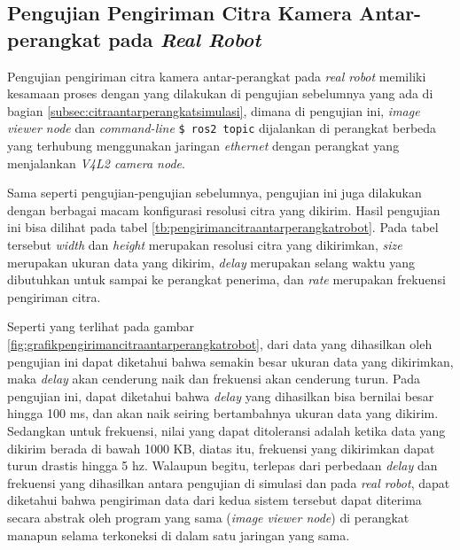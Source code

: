 \subsection{Pengujian Pengiriman Citra Kamera Antar-perangkat pada \emph{Real Robot}}
\label{subsec:citraantarperangkatrobot}



Pengujian pengiriman citra kamera antar-perangkat pada \emph{real robot} memiliki kesamaan proses dengan yang dilakukan di pengujian sebelumnya yang ada di bagian \ref{subsec:citraantarperangkatsimulasi},
  dimana di pengujian ini, \emph{image viewer node} dan \emph{command-line} \lstinline{$ ros2 topic} dijalankan di perangkat berbeda yang terhubung menggunakan jaringan \emph{ethernet} dengan perangkat yang menjalankan \emph{V4L2 camera node}.

Sama seperti pengujian-pengujian sebelumnya,
  pengujian ini juga dilakukan dengan berbagai macam konfigurasi resolusi citra yang dikirim.
Hasil pengujian ini bisa dilihat pada tabel \ref{tb:pengirimancitraantarperangkatrobot}.
Pada tabel tersebut \emph{width} dan \emph{height} merupakan resolusi citra yang dikirimkan,
  \emph{size} merupakan ukuran data yang dikirim,
  \emph{delay} merupakan selang waktu yang dibutuhkan untuk sampai ke perangkat penerima,
  dan \emph{rate} merupakan frekuensi pengiriman citra.



Seperti yang terlihat pada gambar \ref{fig:grafikpengirimancitraantarperangkatrobot},
  dari data yang dihasilkan oleh pengujian ini dapat diketahui bahwa semakin besar ukuran data yang dikirimkan,
  maka \emph{delay} akan cenderung naik dan frekuensi akan cenderung turun.
Pada pengujian ini, dapat diketahui bahwa \emph{delay} yang dihasilkan bisa bernilai besar hingga 100 ms,
  dan akan naik seiring bertambahnya ukuran data yang dikirim.
Sedangkan untuk frekuensi,
  nilai yang dapat ditoleransi adalah ketika data yang dikirim berada di bawah 1000 KB,
  diatas itu, frekuensi yang dikirimkan dapat turun drastis hingga 5 hz.
Walaupun begitu, terlepas dari perbedaan \emph{delay} dan frekuensi yang dihasilkan antara pengujian di simulasi dan pada \emph{real robot},
  dapat diketahui bahwa pengiriman data dari kedua sistem tersebut dapat diterima secara abstrak oleh program yang sama (\emph{image viewer node}) di perangkat manapun selama terkoneksi di dalam satu jaringan yang sama.
